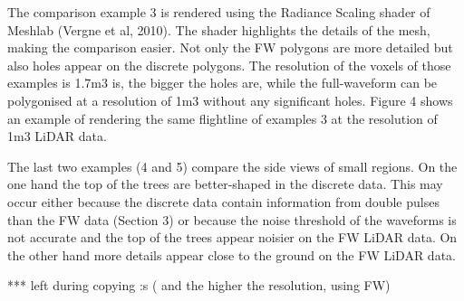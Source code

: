 \documentclass{subfiles}
\begin{document}
The comparison example 3 is rendered using the Radiance Scaling shader of Meshlab (Vergne et al, 2010). The shader highlights the details of the mesh, making the comparison easier. Not only the FW polygons are more detailed but also holes appear on the discrete polygons. The resolution of the voxels of those examples is 1.7m3 is, the bigger the holes are, while the full-waveform can be polygonised at a resolution of 1m3 without any significant holes. Figure 4 shows an example of rendering the same flightline of examples 3 at the resolution of 1m3 LiDAR data.

The last two examples (4 and 5) compare the side views of small regions. On the one hand the top of the trees are better-shaped in the discrete data. This may occur either because the discrete data contain information from double pulses than the FW data (Section 3) or because the noise threshold of the waveforms is not accurate and the top of the trees appear noisier on the FW LiDAR data. On the other hand more details appear close to the ground on the FW LiDAR data.

*** left during copying :s ( and the higher the resolution, using FW)
\end{document}
